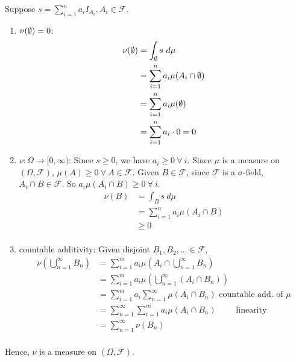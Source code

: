 \documentclass[12pt]{article}
\begin{document}
\begin{problem}[2]
Suppose $ s= \sum_{ i= 1}^{ n} a_i I_{A_i}, A_i \in \mathcal{F}$.
~\begin{enumerate}[label=(\roman*)]
	\item $ \nu( \emptyset) = 0$: 
		\begin{align*}
			\nu( \emptyset) &= \int_{ \emptyset} s \ d  \mu  \\
				 &= \sum_{ i= 1}^{ n} a_i \mu(A_i \cap \emptyset) \\
				 &= \sum_{ i= 1}^{ n} a_i \mu( \emptyset) \\
				 &= \sum_{ i= 1}^{ n} a_i \cdot  0 =0 \\
		\end{align*}
	\item $ \nu: \Omega \to [0,\infty)$: Since $ s \geq 0$, we have  $ a_i \geq 0 \ \forall \ i$. Since $ \mu$ is a measure on $ (\Omega,\mathcal{F})$, $ \mu(A) \geq 0 \ \forall \ A \in \mathcal{F}$. Given $ B \in \mathcal{F}$, since $ \mathcal{F}$ is a $\sigma$-field, $ A_i \cap B \in \mathcal{F}$. So $ a_i \mu(A_i \cap B) \geq 0 \ \forall \ i$. 
		\begin{align*}
			\nu(B)&= \int_{ B} s \ d  \mu \\
			      &= \sum_{ i= 1}^{ n} a_i \mu(A_i \cap B) \\
			      &\geq 0  \\
		\end{align*}
	\item countable additivity: Given disjoint $ B_1, B_2, \ldots \in \mathcal{F}$,
		\begin{align*}
			\nu \left( \bigcup_{ n =1}^{\infty} B_n \right) &= \sum_{ i= 1}^{ m} a_i \mu\left( A_i \cap \bigcup_{ n =1}^{\infty} B_n \right)  \\
									&= \sum_{ i= 1}^{ m} a_i \mu\left( \bigcup_{ n =1}^{\infty} (A_i \cap B_n) \right)  \\
									&= \sum_{ i= 1}^{ m} a_i \sum_{ n= 1}^{\infty} \mu(A_i \cap B_n) \text{ countable add. of } \mu\\
									&= \sum_{ n= 1}^{\infty} \sum_{ i= 1}^{ m} a_i \mu(A_i \cap B_n) \qquad \text{ linearity} \\
									&= \sum_{ n= 1}^{\infty} \nu(B_n) \\
		\end{align*}
\end{enumerate}
Hence, $ \nu$ is a measure on $ (\Omega,\mathcal{F})$.
\end{problem}
\end{document}
